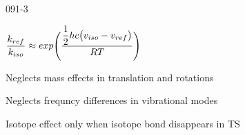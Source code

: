 \begin{mitframe}{091-3}
\begin{listone}
		\item $\dfrac{\thermcond_{ref}}{\thermcond_{iso}}\approx{exp}\Bigg(\dfrac{\dfrac{1}{2}\heattranscoeff{c}\big(\vvel_{iso}-\vvel_{ref}\big)}{\gasconst\Temp}\Bigg)$
	\begin{listtwo}
    		\item Neglects mass effects in translation and rotations
            \item Neglects frequncy differences in vibrational modes
            \item Isotope effect only when isotope bond disappears in TS
    \end{listtwo}
\end{listone}        
\end{mitframe}